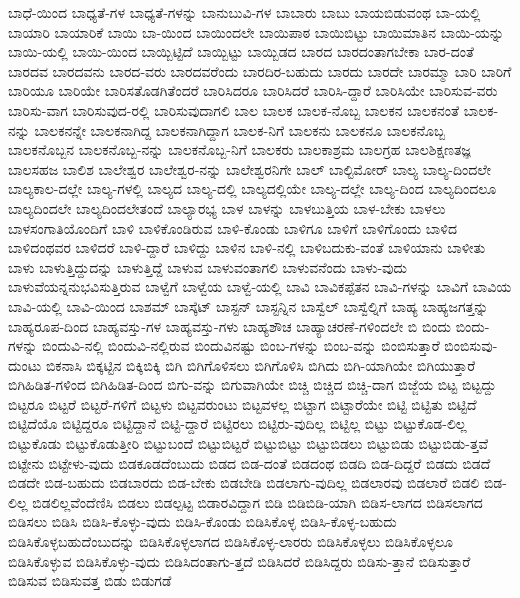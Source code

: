 {ಬಾಧೆ-ಯಿಂದ
ಬಾಧ್ಯತೆ-ಗಳ
ಬಾಧ್ಯತೆ-ಗಳನ್ನು
ಬಾನುಬುವಿ-ಗಳ
ಬಾಬಾರು
ಬಾಬು
ಬಾಯಬಿಡುವಂಥ
ಬಾ-ಯಲ್ಲಿ
ಬಾಯಾರಿ
ಬಾಯಾರಿಕೆ
ಬಾಯಿ
ಬಾ-ಯಿಂದ
ಬಾಯಿಂದಲೇ
ಬಾಯಿಪಾಠ
ಬಾಯಿಬಿಟ್ಟು
ಬಾಯಿಮಾತಿನ
ಬಾಯಿ-ಯನ್ನು
ಬಾಯಿ-ಯಲ್ಲಿ
ಬಾಯಿ-ಯಿಂದ
ಬಾಯ್ಬಿಟ್ಟಿದೆ
ಬಾಯ್ಬಿಟ್ಟು
ಬಾಯ್ಬಿಡದ
ಬಾರದ
ಬಾರದಂತಾಗಬೇಕಾ
ಬಾರ-ದಂತೆ
ಬಾರದವ
ಬಾರದವನು
ಬಾರದ-ವರು
ಬಾರದವರೆಂದು
ಬಾರದಿರ-ಬಹುದು
ಬಾರದು
ಬಾರದೇ
ಬಾರಮ್ಮಾ
ಬಾರಿ
ಬಾರಿಗೆ
ಬಾರಿಯೂ
ಬಾರಿಯೇ
ಬಾರಿಸತೊಡಗಿತೆಂದರೆ
ಬಾರಿಸಿದರೂ
ಬಾರಿಸಿದರೆ
ಬಾರಿಸಿ-ದ್ದಾರೆ
ಬಾರಿಸಿಯೇ
ಬಾರಿಸುವ-ವರು
ಬಾರಿಸು-ವಾಗ
ಬಾರಿಸುವುದ-ರಲ್ಲಿ
ಬಾರಿಸುವುದಾಗಲಿ
ಬಾಲ
ಬಾಲಕ
ಬಾಲಕ-ನೊಬ್ಬ
ಬಾಲಕನ
ಬಾಲಕನಂತೆ
ಬಾಲಕ-ನನ್ನು
ಬಾಲಕನನ್ನೇ
ಬಾಲಕನಾಗಿದ್ದ
ಬಾಲಕನಾಗಿದ್ದಾಗ
ಬಾಲಕ-ನಿಗೆ
ಬಾಲಕನು
ಬಾಲಕನೂ
ಬಾಲಕನೊಬ್ಬ
ಬಾಲಕನೊಬ್ಬನ
ಬಾಲಕನೊಬ್ಬ-ನನ್ನು
ಬಾಲಕನೊಬ್ಬ-ನಿಗೆ
ಬಾಲಕರು
ಬಾಲಕಾಶ್ರಮ
ಬಾಲಗ್ರಹ
ಬಾಲಶಿಕ್ಷಣತಜ್ಞ
ಬಾಲಸಹಜ
ಬಾಲಿಶ
ಬಾಲೇಶ್ವರ
ಬಾಲೇಶ್ವರ-ನನ್ನು
ಬಾಲೇಶ್ವರನಿಗೇ
ಬಾಲ್
ಬಾಲ್ಟಿಮೋರ್
ಬಾಲ್ಯ
ಬಾಲ್ಯ-ದಿಂದಲೇ
ಬಾಲ್ಯಕಾಲ-ದಲ್ಲೇ
ಬಾಲ್ಯ-ಗಳಲ್ಲಿ
ಬಾಲ್ಯದ
ಬಾಲ್ಯ-ದಲ್ಲಿ
ಬಾಲ್ಯದಲ್ಲಿಯೇ
ಬಾಲ್ಯ-ದಲ್ಲೇ
ಬಾಲ್ಯ-ದಿಂದ
ಬಾಲ್ಯದಿಂದಲೂ
ಬಾಲ್ಯದಿಂದಲೇ
ಬಾಲ್ಯದಿಂದಲೇತಂದೆ
ಬಾಲ್ಯಾರಭ್ಯ
ಬಾಳ
ಬಾಳನ್ನು
ಬಾಳಬುತ್ತಿಯ
ಬಾಳ-ಬೇಕು
ಬಾಳಲು
ಬಾಳಸಂಗಾತಿಯೊಂದಿಗೆ
ಬಾಳಿ
ಬಾಳಿಕೊಂಡಿರುವ
ಬಾಳಿ-ಕೊಂಡು
ಬಾಳಿಗೂ
ಬಾಳಿಗೆ
ಬಾಳಿಗೊಂದು
ಬಾಳಿದ
ಬಾಳಿದಂಥವರ
ಬಾಳಿದರೆ
ಬಾಳಿ-ದ್ದಾರೆ
ಬಾಳಿದ್ದು
ಬಾಳಿನ
ಬಾಳಿ-ನಲ್ಲಿ
ಬಾಳಿಬದುಕು-ವಂತೆ
ಬಾಳಿಯಾನು
ಬಾಳೀತು
ಬಾಳು
ಬಾಳುತ್ತಿದ್ದುದನ್ನು
ಬಾಳುತ್ತಿದ್ದೆ
ಬಾಳುವ
ಬಾಳುವಂತಾಗಲಿ
ಬಾಳುವನೆಂದು
ಬಾಳು-ವುದು
ಬಾಳುವೆಯನ್ನನುಭವಿಸುತ್ತಿರುವ
ಬಾಳ್ವೆಗೆ
ಬಾಳ್ವೆಯ
ಬಾಳ್ವೆ-ಯಲ್ಲಿ
ಬಾವಿ
ಬಾವಿಕಪ್ಪೆತನ
ಬಾವಿ-ಗಳನ್ನು
ಬಾವಿಗೆ
ಬಾವಿಯ
ಬಾವಿ-ಯಲ್ಲಿ
ಬಾವಿ-ಯಿಂದ
ಬಾಶಮ್
ಬಾಸ್ಕೆಟ್
ಬಾಸ್ಟನ್
ಬಾಸ್ಟನ್ನಿನ
ಬಾಸ್ವೆಲ್
ಬಾಸ್ವೆಲ್ನಿಗೆ
ಬಾಹ್ಯ
ಬಾಹ್ಯಜಗತ್ತನ್ನು
ಬಾಹ್ಯರೂಪ-ದಿಂದ
ಬಾಹ್ಯವಸ್ತು-ಗಳ
ಬಾಹ್ಯವಸ್ತು-ಗಳು
ಬಾಹ್ಯಶೌಚ
ಬಾಹ್ಯಾಚರಣೆ-ಗಳಿಂದಲೇ
ಬಿ
ಬಿಂದು
ಬಿಂದು-ಗಳನ್ನು
ಬಿಂದುವಿ-ನಲ್ಲಿ
ಬಿಂದುವಿ-ನಲ್ಲಿರುವ
ಬಿಂದುವಿನಷ್ಟು
ಬಿಂಬ-ಗಳನ್ನು
ಬಿಂಬ-ವನ್ನು
ಬಿಂಬಿಸುತ್ತಾರೆ
ಬಿಂಬಿಸುವು-ದುಂಟು
ಬಿಕನಾಸಿ
ಬಿಕ್ಕಟ್ಟಿನ
ಬಿಕ್ಕಿಬಿಕ್ಕಿ
ಬಿಗಿ
ಬಿಗಿಗೊಳಿಸಲು
ಬಿಗಿಗೊಳಿಸಿ
ಬಿಗಿದು
ಬಿಗಿ-ಯಾಗಿಯೇ
ಬಿಗಿಯುತ್ತಾರೆ
ಬಿಗಿಹಿಡಿತ-ಗಳಿಂದ
ಬಿಗಿಹಿಡಿತ-ದಿಂದ
ಬಿಗು-ವನ್ನು
ಬಿಗುವಾಗಿಯೇ
ಬಿಚ್ಚಿ
ಬಿಚ್ಚಿದ
ಬಿಚ್ಚಿ-ದಾಗ
ಬಿಜ್ಜೆಯ
ಬಿಟ್ಟ
ಬಿಟ್ಟದ್ದು
ಬಿಟ್ಟರೂ
ಬಿಟ್ಟರೆ
ಬಿಟ್ಟರೆ-ಗಳಿಗೆ
ಬಿಟ್ಟಳು
ಬಿಟ್ಟವರುಂಟು
ಬಿಟ್ಟವಳಲ್ಲ
ಬಿಟ್ಟಾಗ
ಬಿಟ್ಟಾರೆಯೇ
ಬಿಟ್ಟಿ
ಬಿಟ್ಟಿತು
ಬಿಟ್ಟಿದೆ
ಬಿಟ್ಟಿದೆಯೊ
ಬಿಟ್ಟಿದ್ದರೂ
ಬಿಟ್ಟಿದ್ದಾನೆ
ಬಿಟ್ಟಿ-ದ್ದಾರೆ
ಬಿಟ್ಟಿರಲು
ಬಿಟ್ಟಿರು-ವುದಿಲ್ಲ
ಬಿಟ್ಟಿಲ್ಲ
ಬಿಟ್ಟು
ಬಿಟ್ಟುಕೊಡ-ಲಿಲ್ಲ
ಬಿಟ್ಟುಕೊಡು
ಬಿಟ್ಟುಕೊಡುತ್ತೀರಿ
ಬಿಟ್ಟುಬಂದೆ
ಬಿಟ್ಟುಬಿಟ್ಟರೆ
ಬಿಟ್ಟುಬಿಟ್ಟು
ಬಿಟ್ಟುಬಿಡಲು
ಬಿಟ್ಟುಬಿಡು
ಬಿಟ್ಟುಬಿಡು-ತ್ತವೆ
ಬಿಟ್ಟೇನು
ಬಿಟ್ಟೇಳು-ವುದು
ಬಿಡಕೂಡದೆಂಬುದು
ಬಿಡದ
ಬಿಡ-ದಂತೆ
ಬಿಡದಂಥ
ಬಿಡದಿ
ಬಿಡ-ದಿದ್ದರೆ
ಬಿಡದು
ಬಿಡದೆ
ಬಿಡದೇ
ಬಿಡ-ಬಹುದು
ಬಿಡಬಾರದು
ಬಿಡ-ಬೇಕು
ಬಿಡಬೇಡಿ
ಬಿಡಲಾಗು-ವುದಿಲ್ಲ
ಬಿಡಲಾರವು
ಬಿಡಲಾರೆ
ಬಿಡಲಿ
ಬಿಡ-ಲಿಲ್ಲ
ಬಿಡಲಿಲ್ಲವೆಂದೆಣಿಸಿ
ಬಿಡಲು
ಬಿಡಲ್ಪಟ್ಟ
ಬಿಡಾರವಿದ್ದಾಗ
ಬಿಡಿ
ಬಿಡಿಬಿಡಿ-ಯಾಗಿ
ಬಿಡಿಸ-ಲಾಗದ
ಬಿಡಿಸಲಾಗದ
ಬಿಡಿಸಲು
ಬಿಡಿಸಿ
ಬಿಡಿಸಿ-ಕೊಳ್ಳು-ವುದು
ಬಿಡಿಸಿ-ಕೊಂಡು
ಬಿಡಿಸಿಕೊಳ್ಳ
ಬಿಡಿಸಿ-ಕೊಳ್ಳ-ಬಹುದು
ಬಿಡಿಸಿಕೊಳ್ಳಬಹುದೆಂಬುದನ್ನು
ಬಿಡಿಸಿಕೊಳ್ಳಲಾಗದ
ಬಿಡಿಸಿಕೊಳ್ಳ-ಲಾರರು
ಬಿಡಿಸಿಕೊಳ್ಳಲು
ಬಿಡಿಸಿಕೊಳ್ಳಲೂ
ಬಿಡಿಸಿಕೊಳ್ಳುವ
ಬಿಡಿಸಿಕೊಳ್ಳು-ವುದು
ಬಿಡಿಸಿದಂತಾಗು-ತ್ತದೆ
ಬಿಡಿಸಿದರೆ
ಬಿಡಿಸಿದ್ದರು
ಬಿಡಿಸು-ತ್ತಾನೆ
ಬಿಡಿಸುತ್ತಾರೆ
ಬಿಡಿಸುವ
ಬಿಡಿಸುವತ್ತ
ಬಿಡು
ಬಿಡುಗಡೆ
}
